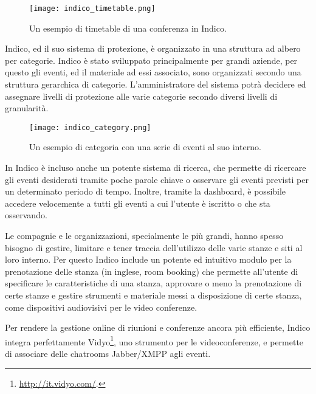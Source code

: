 		\begin{figure}[h!]
			\begin{center}
				\texttt{[image: indico\_timetable.png]}
			\end{center}
			\caption[Timetable in Indico (esempio)]{Un esempio di timetable di una conferenza in Indico.}
			\label{fig:indico_timetable}
		\end{figure}
		
		Indico, ed il suo sistema di protezione, è organizzato in una struttura ad albero per categorie. Indico è stato sviluppato principalmente per grandi aziende, per questo gli eventi, ed il materiale ad essi associato, sono organizzati secondo una struttura gerarchica di categorie. L'amministratore del sistema potrà decidere ed assegnare livelli di protezione alle varie categorie secondo diversi livelli di granularità.

		\begin{figure}[h!]
			\begin{center}
				\texttt{[image: indico\_category.png]}
			\end{center}
			\caption[Categoria in Indico (esempio)]{Un esempio di categoria con una serie di eventi al suo interno.}
			\label{fig:indico_category}
		\end{figure}
		
		In Indico è incluso anche un potente sistema di ricerca, che permette di ricercare gli eventi desiderati tramite poche parole chiave o osservare gli eventi previsti per un determinato periodo di tempo. Inoltre, tramite la dashboard, è possibile accedere velocemente a tutti gli eventi a cui l'utente è iscritto o che sta osservando.
		
		Le compagnie e le organizzazioni, specialmente le più grandi, hanno spesso bisogno di gestire, limitare e tener traccia dell'utilizzo delle varie stanze e siti al loro interno. Per questo Indico include un potente ed intuitivo modulo per la prenotazione delle stanza (in inglese, room booking) che permette all'utente di specificare le caratteristiche di una stanza, approvare o meno la prenotazione di certe stanze e gestire strumenti e materiale messi a disposizione di certe stanza, come dispositivi audiovisivi per le video conferenze.
		
		Per rendere la gestione online di riunioni e conferenze ancora più efficiente, Indico integra perfettamente Vidyo\footnote{\url{http://it.vidyo.com/}.}, uno strumento per le videoconferenze, e permette di associare delle chatrooms Jabber/XMPP agli eventi.

